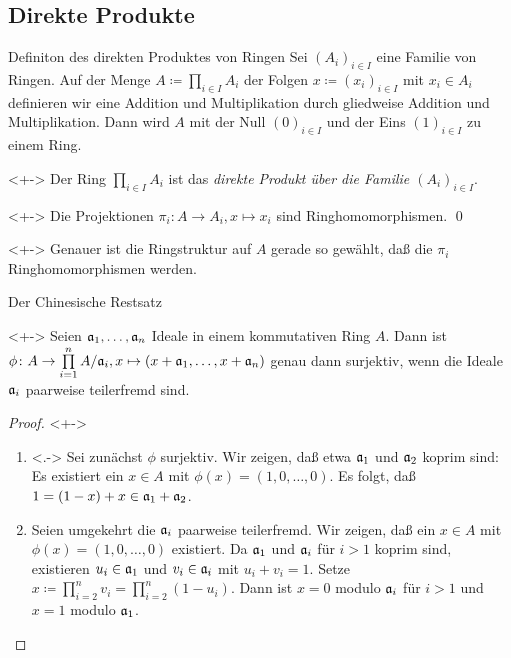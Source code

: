 \subsection{Direkte Produkte}

\begin{frame}{Definiton des direkten Produktes von Ringen}
    Sei \((A_i)_{i \in I}\) eine Familie von Ringen. Auf der Menge
    \(A \coloneqq \prod\limits_{i \in I} A_i\) der Folgen
    \(x \coloneqq (x_i)_{i \in I}\)
    mit \(x_i \in A_i\) definieren wir eine Addition und Multiplikation durch
    gliedweise Addition und Multiplikation. Dann wird \(A\) mit der Null
    \((0)_{i \in I}\) und der Eins \((1)_{i \in I}\) zu einem Ring.
    \begin{definition}<+->
        Der Ring \(\prod\limits_{i \in I} A_i\) ist das \emph{direkte Produkt
        über die Familie \((A_i)_{i \in I}\)}.
    \end{definition}
    \begin{proposition}<+->
        Die Projektionen \(\pi_i\colon A \to A_i, x \mapsto x_i\) sind
        Ringhomomorphismen.
        \qed
    \end{proposition}
    \begin{visibleenv}<+->
        Genauer ist die Ringstruktur auf \(A\) gerade so gewählt, daß die \(\pi_i\)
        Ringhomomorphismen werden.
    \end{visibleenv}
\end{frame}

\begin{frame}{Der Chinesische Restsatz}
    \begin{proposition}<+->
        Seien \(\mathfrak{a}_1, \dotsc, \mathfrak{a}_n\) Ideale in einem kommutativen
        Ring \(A\). Dann ist \(\phi\colon A \to \prod\limits_{i = 1}^n
        A/\mathfrak{a}_i, x \mapsto (x + \mathfrak{a}_1, \dotsc, x + \mathfrak{a}_n)\)
        genau dann surjektiv, wenn die Ideale \(\mathfrak{a}_i\) paarweise
        teilerfremd sind.
    \end{proposition}
    \begin{proof}<+->
        \begin{enumerate}[<+->]
        \item<.->
            Sei zunächst \(\phi\) surjektiv. Wir zeigen, daß etwa \(\mathfrak{a}_1\)
            und \(\mathfrak{a}_2\) koprim sind: Es existiert ein \(x \in A\)
            mit \(\phi(x) = (1, 0, \dotsc, 0)\). Es folgt, daß \(1 = (1 - x) + x
            \in \mathfrak{a}_1 + \mathfrak{a}_2\).
        \item
            Seien umgekehrt die \(\mathfrak{a}_i\) paarweise teilerfremd. Wir
            zeigen, daß ein \(x \in A\) mit \(\phi(x) = (1, 0, \dotsc, 0)\)
            existiert. Da \(\mathfrak{a}_1\) und \(\mathfrak{a}_i\) für \(i > 1\) koprim
            sind, existieren \(u_i \in \mathfrak{a}_1\) und \(v_i \in \mathfrak{a}_i\)
            mit \(u_i + v_i = 1\). Setze \(x \coloneqq \prod\limits_{i = 2}^n
            v_i = \prod\limits_{i = 2}^n (1 - u_i)\). Dann ist \(x = 0\) modulo
            \(\mathfrak{a}_i\) für \(i > 1\) und \(x = 1\) modulo \(\mathfrak{a}_1\).
            \qedhere
        \end{enumerate}
    \end{proof}
\end{frame}

